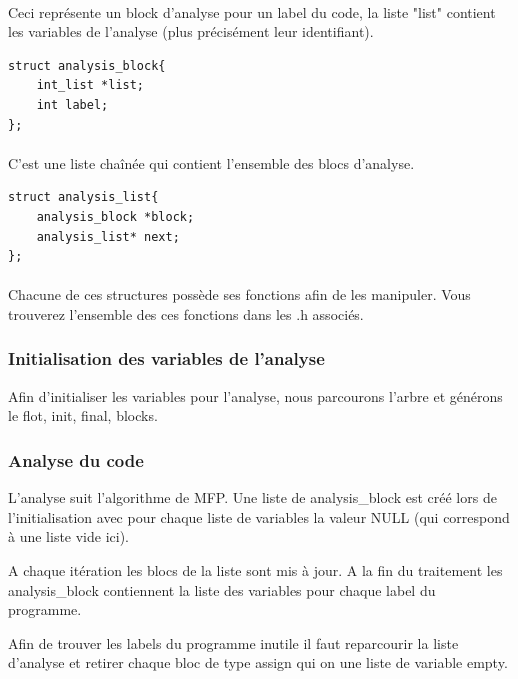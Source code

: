 \documentclass[12pt,a4paper,oneside]{article}
\begin{document}
\paragraph{}
Ceci représente un block d'analyse pour un label du code, la liste "list" contient les variables de l'analyse (plus précisément leur identifiant).
\begin{lstlisting}
struct analysis_block{
	int_list *list;
	int label;
};
\end{lstlisting}

\paragraph{}
C'est une liste chaînée qui contient l'ensemble des blocs d'analyse.
\begin{lstlisting}
struct analysis_list{
	analysis_block *block;
	analysis_list* next;
};
\end{lstlisting}

\paragraph{}
Chacune de ces structures possède ses fonctions afin de les manipuler.
Vous trouverez l'ensemble des ces fonctions dans les .h associés.

\subsubsection{Initialisation des variables de l'analyse}
Afin d'initialiser les variables pour l'analyse, nous parcourons l'arbre et générons le flot, init, final, blocks.

\subsubsection{Analyse du code}
L'analyse suit l'algorithme de MFP. Une liste de analysis\_block est créé lors de l'initialisation avec pour chaque liste de variables la valeur NULL (qui correspond à une liste vide ici).

A chaque itération les blocs de la liste sont mis à jour. A la fin du traitement les analysis\_block contiennent la liste des variables pour chaque label du programme.

Afin de trouver les labels du programme inutile il faut reparcourir la liste d'analyse et retirer chaque bloc de type assign qui on une liste de variable empty.

\newpage
\end{document}
